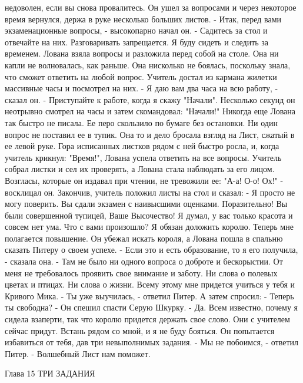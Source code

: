 недоволен, если вы снова провалитесь.
    Он ушел за вопросами и через некоторое время вернулся, держа в 
руке несколько больших листов.
    - Итак, перед вами экзаменационные вопросы, - высокопарно начал 
он. - Садитесь за стол и отвечайте на них. Разговаривать запрещается. 
Я буду сидеть и следить за временем.
    Лована взяла вопросы и разложила перед собой на столе. Она ни 
капли не волновалась, как раньше. Она нисколько не боялась, поскольку 
знала, что сможет ответить на любой вопрос.
    Учитель достал из кармана жилетки массивные часы и посмотрел на 
них.
    - Я даю вам два часа на всю работу, - сказал он. - Приступайте к 
работе, когда я скажу "Начали".
    Несколько секунд он неотрывно смотрел на часы и затем скомандовал: 
"Начали!"
    Никогда еще Лована так быстро не писала. Ее перо скользило по 
бумаге без остановки. Ни один вопрос не поставил ее в тупик. Она то и 
дело бросала взгляд на Лист, сжатый в ее левой руке. Гора исписанных 
листков рядом с ней быстро росла, и, когда учитель крикнул: "Время!", 
Лована успела ответить на все вопросы.
    Учитель собрал листки и сел их проверять, а Лована стала наблюдать 
за его лицом. Возгласы, которые он издавал при чтении, не тревожили 
ее: "А-а! О-о! Ох!" - восклицал он.
    Закончив, учитель положил листы на стол и сказал:
    - Я просто не могу поверить. Вы сдали экзамен с наивысшими 
оценками. Поразительно! Вы были совершенной тупицей, Ваше Высочество! 
Я думал, у вас только красота и совсем нет ума. Что с вами произошло? 
Я обязан доложить королю. Теперь мне полагается повышение.
    Он убежал искать короля, а Лована пошла в спальню сказать Питеру о 
своем успехе.
    - Если это и есть образование, то я его получила, - сказала она. - 
Там не было ни одного вопроса о доброте и бескорыстии. От меня не 
требовалось проявить свое внимание и заботу. Ни слова о полевых цветах 
и птицах. Ни слова о жизни. Всему этому мне придется учиться у тебя и 
Кривого Мика.
    - Ты уже выучилась, - ответил Питер. А затем спросил: - Теперь ты 
свободна? - Он спешил спасти Серую Шкурку.
    - Да. Всем известно, почему я сидела взаперти, так что королю 
придется держать свое слово. Они с учителем сейчас придут. Встань 
рядом со мной, и я не буду бояться. Он попытается избавиться от тебя, 
дав три невыполнимых задания.
    - Мы не побоимся, - ответил Питер. - Волшебный Лист нам поможет.

        Глава 15
        ТРИ ЗАДАНИЯ

